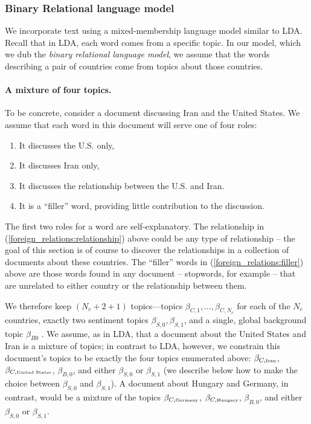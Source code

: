 \subsubsection*{Binary Relational language model}
We incorporate text using a mixed-membership language model similar to
LDA.  Recall that in LDA, each word comes from a specific topic.  In
our model, which we dub the \emph{binary relational language model},
we assume that the words describing a pair of countries come from
topics about those countries.

\paragraph{A mixture of four topics.} To be concrete, consider a document discussing Iran and the United
States.  We assume that each word in this document will serve one of
four roles:
\begin{enumerate}
  \item It discusses the U.S. only,
  \item It discusses Iran only,
  \item It discusses the relationship between the U.S. and Iran. \label{foreign_relations:relationship}
  \item It is a ``filler'' word, providing little contribution to the discussion. \label{foreign_relations:filler}
\end{enumerate}
The first two roles for a word are self-explanatory.  The relationship in
(\ref{foreign_relations:relationship}) above could be any type of
relationship -- the goal of this section is of course to discover the
relationships in a collection of documents about these
countries.  The ``filler'' words in
(\ref{foreign_relations:filler}) above are those words found in any document
-- stopwords, for example -- that are unrelated to either country or
the relationship between them.

We therefore keep $(N_c + 2 + 1)$ topics---topics $\beta_{C,1},
\ldots, \beta_{C,{N_c}}$ for each of the $N_c$ countries, exactly two
sentiment topics $\beta_{S,0}, \beta_{S,1}$, and a single, global
background topic $\beta_{B0}$ \citep{chemudugunta:2009}.  We assume,
as in LDA, that a document about the United States and Iran is a
mixture of topics; in contrast to LDA, however, we constrain this
document's topics to be exactly the four topics enumerated above:
$\beta_{C,\mbox{\tiny Iran}}$, $\beta_{C,\mbox{\tiny United States}}$,
$\beta_{B,0}$, and either $\beta_{S,0}$ or $\beta_{S,1}$ (we describe
below how to make the choice between $\beta_{S,0}$ and $\beta_{S,1}$).
A document about Hungary and Germany, in contrast, would be a mixture
of the topics $\beta_{C,\mbox{\tiny Germany}}$, $\beta_{C,\mbox{\tiny
    Hungary}}$, $\beta_{B,0}$, and either $\beta_{S,0}$ or
$\beta_{S,1}$.

